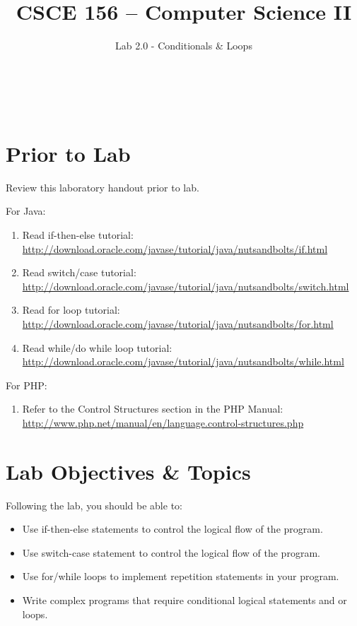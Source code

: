 \documentclass[12pt]{scrartcl}
\title{CSCE 156 -- Computer Science II}
\subtitle{Lab 2.0 - Conditionals \& Loops}
\author{~}
\date{~}
\begin{document}
\maketitle

\section*{Prior to Lab}

Review this laboratory handout prior to lab.

For Java:
\begin{enumerate}
  \item Read if-then-else tutorial: \\
  	\url{http://download.oracle.com/javase/tutorial/java/nutsandbolts/if.html}
  \item Read switch/case tutorial:\\
  	\url{http://download.oracle.com/javase/tutorial/java/nutsandbolts/switch.html}
  \item Read for loop tutorial:\\
  	\url{http://download.oracle.com/javase/tutorial/java/nutsandbolts/for.html}
  \item Read while/do while loop tutorial:\\
  	\url{http://download.oracle.com/javase/tutorial/java/nutsandbolts/while.html}
\end{enumerate}

For PHP:
\begin{enumerate}
  \item Refer to the Control Structures section in the PHP Manual: \\
    \url{http://www.php.net/manual/en/language.control-structures.php}
\end{enumerate}

\section*{Lab Objectives \& Topics}
Following the lab, you should be able to:
\begin{itemize}
  \item Use if-then-else statements to control the logical flow of the program.
  \item Use switch-case statement to control the logical flow of the program.
  \item Use for/while loops to implement repetition statements in your program.
  \item Write complex programs that require conditional logical statements and or loops.
\end{itemize}
\end{document}
